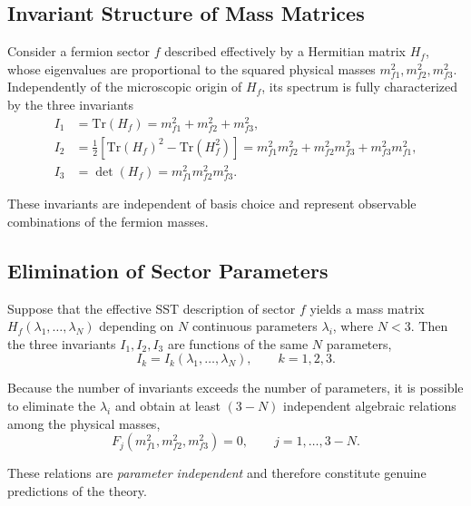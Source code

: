 \documentclass[11pt]{article}
\begin{document}
    \subsection{Invariant Structure of Mass Matrices}

        Consider a fermion sector $f$ described effectively by a Hermitian matrix
        $H_f$, whose eigenvalues are proportional to the squared physical masses
        $m_{f1}^2,m_{f2}^2,m_{f3}^2$.
        Independently of the microscopic origin of $H_f$, its spectrum is fully
        characterized by the three invariants
        \begin{align}
            I_1 &= \mathrm{Tr}(H_f)
            = m_{f1}^2 + m_{f2}^2 + m_{f3}^2,\\
            I_2 &= \tfrac12\!\left[\mathrm{Tr}(H_f)^2 - \mathrm{Tr}(H_f^2)\right]
            = m_{f1}^2 m_{f2}^2 + m_{f2}^2 m_{f3}^2 + m_{f3}^2 m_{f1}^2,\\
            I_3 &= \det(H_f)
            = m_{f1}^2 m_{f2}^2 m_{f3}^2 .
        \end{align}

        These invariants are independent of basis choice and represent observable
        combinations of the fermion masses.

    \subsection{Elimination of Sector Parameters}

        Suppose that the effective SST description of sector $f$ yields a mass matrix
        $H_f(\lambda_1,\ldots,\lambda_N)$ depending on $N$ continuous parameters
        $\lambda_i$, where $N<3$.
        Then the three invariants $I_1,I_2,I_3$ are functions of the same $N$ parameters,
        \begin{equation}
            I_k = I_k(\lambda_1,\ldots,\lambda_N), \qquad k=1,2,3 .
        \end{equation}

        Because the number of invariants exceeds the number of parameters, it is
        possible to eliminate the $\lambda_i$ and obtain at least $(3-N)$ independent
        algebraic relations among the physical masses,
        \begin{equation}
            F_j(m_{f1}^2,m_{f2}^2,m_{f3}^2)=0,
            \qquad j=1,\ldots,3-N .
        \end{equation}

        These relations are \emph{parameter independent} and therefore constitute
        genuine predictions of the theory.
\end{document}
